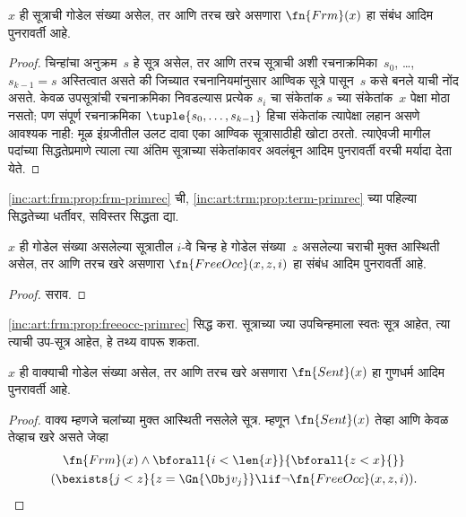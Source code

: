 \begin{prop}
\label{inc:art:frm:prop:frm-primrec}
$x$ ही सूत्राची गोडेल संख्या असेल, तर आणि तरच
खरे असणारा $\fn{Frm}(x)$ हा संबंध आदिम पुनरावर्ती आहे.
\end{prop}

\begin{proof}
चिन्हांचा अनुक्रम~$s$ हे सूत्र असेल, तर आणि तरच
सूत्राची अशी रचनाक्रमिका~$s_0$, \dots, $s_{k-1} = s$
अस्तित्वात असते की जिच्यात रचनानियमांनुसार आण्विक सूत्रे
पासून~$s$ कसे बनले याची नोंद असते. केवळ उपसूत्रांची रचनाक्रमिका
निवडल्यास प्रत्येक $s_i$ चा संकेतांक
$s$ च्या संकेतांक~$x$ पेक्षा मोठा नसतो; पण संपूर्ण रचनाक्रमिका
$\tuple{s_0, \dots, s_{k-1}}$ हिचा संकेतांक त्यापेक्षा लहान
असणे आवश्यक नाही: मूळ इंग्रजीतील उलट दावा एका आण्विक सूत्रासाठीही
खोटा ठरतो. त्याऐवजी मागील पदांच्या सिद्धतेप्रमाणे त्याला
त्या अंतिम सूत्राच्या संकेतांकावर अवलंबून आदिम पुनरावर्ती वरची
मर्यादा देता येते.
\end{proof}

\begin{prob}
\ref{inc:art:frm:prop:frm-primrec} ची,
\ref{inc:art:trm:prop:term-primrec} च्या पहिल्या सिद्धतेच्या
धर्तीवर, सविस्तर सिद्धता द्या.
\end{prob}

\begin{prop}
\label{inc:art:frm:prop:freeocc-primrec}
$x$ ही गोडेल संख्या असलेल्या सूत्रातील $i$-वे चिन्ह हे
गोडेल संख्या~$z$ असलेल्या चराची मुक्त आस्थिती असेल,
तर आणि तरच खरे असणारा $\fn{FreeOcc}(x, z, i)$ हा संबंध
आदिम पुनरावर्ती आहे.
\end{prop}

\begin{proof}
सराव.
\end{proof}

\begin{prob}
\ref{inc:art:frm:prop:freeocc-primrec} सिद्ध करा.
सूत्राच्या ज्या उपचिन्हमाला स्वतः सूत्र आहेत,
त्या त्याची उप-सूत्र आहेत, हे तथ्य वापरू शकता.
\end{prob}

\begin{prop}
$x$ ही वाक्याची गोडेल संख्या असेल, तर आणि तरच
खरे असणारा $\fn{Sent}(x)$ हा गुणधर्म आदिम पुनरावर्ती आहे.
\end{prop}

\begin{proof}
वाक्य म्हणजे चलांच्या मुक्त आस्थिती नसलेले
सूत्र. म्हणून $\fn{Sent}(x)$ तेव्हा आणि केवळ तेव्हाच खरे असते जेव्हा
\begin{multline*}
\fn{Frm}(x) \land \bforall{i<\len{x}}{\bforall{z<x}{}}\\
(\bexists{j<z}{z=\Gn{\Obj v_j}} \lif \lnot\fn{FreeOcc}(x,z,i)).
\end{multline*}

\end{proof}












